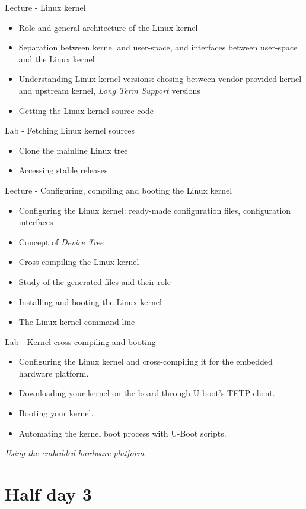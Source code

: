 \documentclass[a4paper,12pt,obeyspaces,spaces,hyphens]{article}
\begin{document}
\feagendatwocolumn
{Lecture - Linux kernel}
{
  \begin{itemize}
  \item Role and general architecture of the Linux kernel
  \item Separation between kernel and user-space, and interfaces
    between user-space and the Linux kernel
  \item Understanding Linux kernel versions: chosing between
    vendor-provided kernel and upstream kernel, {\em Long Term
      Support} versions
  \item Getting the Linux kernel source code
  \end{itemize}
}
{Lab - Fetching Linux kernel sources}
{
  \begin{itemize}
  \item Clone the mainline Linux tree
  \item Accessing stable releases
  \end{itemize}
}

\feagendatwocolumn
{Lecture - Configuring, compiling and booting the Linux kernel}
{
  \begin{itemize}
  \item Configuring the Linux kernel: ready-made configuration files,
    configuration interfaces
  \item Concept of {\em Device Tree}
  \item Cross-compiling the Linux kernel
  \item Study of the generated files and their role
  \item Installing and booting the Linux kernel
  \item The Linux kernel command line
  \end{itemize}
}
{Lab - Kernel cross-compiling and booting}
{
  \begin{itemize}
  \item Configuring the Linux kernel and cross-compiling it for the
    embedded hardware platform.
  \item Downloading your kernel on the board through U-boot's TFTP
    client.
  \item Booting your kernel.
  \item Automating the kernel boot process with U-Boot scripts.
  \end{itemize}

  \vspace{0.5cm}
  {\em Using the embedded hardware platform}
}

\section{Half day 3}
\end{document}
